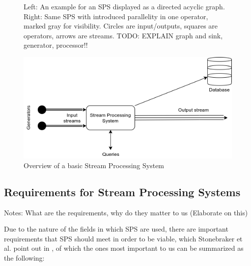 
        \begin{figure}[h]
            \label{fig:sps_parallel_normal}
            \caption{
                    Left: An example for an SPS displayed as a directed acyclic graph. 
                    Right: Same SPS with introduced parallelity in one operator, marked gray for visibility. 
                    Circles are input/outputs, squares are operators, arrows are streams.
                    TODO: EXPLAIN graph and sink, generator, processor!!
                    }
        \end{figure}

        \begin{figure}
        \label{fig:stream-processing-system}
        \centering
        \includegraphics[width=1.0\textwidth]{Bilder/stream-processing-system.png}
        \caption{
                Overview of a basic Stream Processing System
                }
        \end{figure}  

        \subsection{Requirements for Stream Processing Systems}
        \label{sub:requirements}

        Notes: What are the requirements, why do they matter to us (Elaborate on this)

        Due to the nature of the fields in which SPS are used, there are important requirements that SPS should meet in order to be viable, 
        which Stonebraker et al. point out in \cite{Stonebraker:2005:RRS:1107499.1107504}, of which the ones most important to us can be summarized as the following:
        
